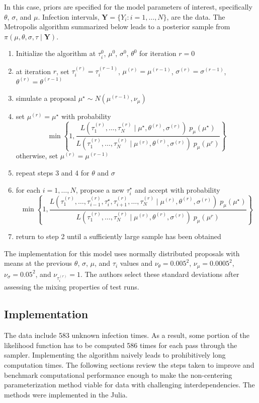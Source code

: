 \documentclass{uwstat572}
\begin{document}
In this case, priors are specified for the model parameters of interest, specifically $\theta$, $\sigma$, and $\mu$. 
Infection intervals, $\textbf{Y} = \{Y_i:i=1,\dots, N\}$, are the data. 
The Metropolis algorithm summarized below leads to a posterior sample from $\pi(\mu, \theta, \sigma, \tau \mid \textbf{Y})$. 

\begin{enumerate}
\item Initialize the algorithm at $\tau_i^{0}$, $\mu^{0}$, $\sigma^{0}$, $\theta^{0}$ for iteration $r=0$
\item at iteration $r$, set $\tau_i^{(r)}=\tau_i^{(r-1)}$, $\mu^{(r)}=\mu^{(r-1)}$, $\sigma^{(r)}=\sigma^{(r-1)}$, $\theta^{(r)}=\theta^{(r-1)}$
\item simulate a proposal $\mu^{\star} \sim N(\mu^{(r-1)}, \nu_{\mu})$
\item set $\mu^{(r)} = \mu^{\star}$ with probability
$$\min \left\{1, \frac{L( \tau^{(r)}_1, \dots, \tau^{(r)}_N \mid \mu^{\star}, \theta^{(r)}, \sigma^{(r)} ) \; p_{\mu}(\mu^{\star})}{L(\tau^{(r)}_1, \dots, \tau^{(r)}_N \mid \mu^{(r)}, \theta^{(r)}, \sigma^{(r)} ) \; p_{\mu}(\mu^{r})} \right\} $$
			otherwise, set $\mu^{(r)}=\mu^{(r-1)}$
\item repeat steps 3 and 4 for $\theta$ and $\sigma$
\item for each $i=1, \dots, N$, propose a new $\tau^{\star}_i$ and accept with probability
$$\min \left\{1, \frac{L( \tau^{(r)}_1, \dots, \tau^{(r)}_{i-1}, \tau^{\star}_i,\tau^{(r)}_{i+1}, \dots, \tau^{(r)}_N \mid \mu^{(r)}, \theta^{(r)}, \sigma^{(r)} ) \; p_{\mu}(\mu^{\star})}{L(\tau^{(r)}_1, \dots, \tau^{(r)}_N \mid \mu^{(r)}, \theta^{(r)}, \sigma^{(r)} ) \; p_{\mu}(\mu^{r})} \right\} $$
\item return to step 2 until a sufficiently large sample has been obtained
\end{enumerate}

The implementation for this model uses normally distributed proposals with means at the previous $\theta$, $\sigma$, $\mu$, and $\tau_i$ values and $ \nu_{\theta}=0.005^2$, $ \nu_{\mu}=0.0005^2$, $ \nu_{\sigma}=0.05^2$, and $ \nu_{\tau^{(r)}_i}=1$. 
The authors select these standard deviations after assessing the mixing properties of test runs. 

\subsection{Implementation}
The data include 583 unknown infection times. 
As a result, some portion of the likelihood function has to be computed 586 times for each pass through the sampler. 
Implementing the algorithm naively leads to prohibitively long computation times. 
The following sections review the steps taken to improve and benchmark computational performance enough to make the non-centering parameterization method viable for data with challenging interdependencies. 
The methods were implemented in the Julia. 
\end{document}
